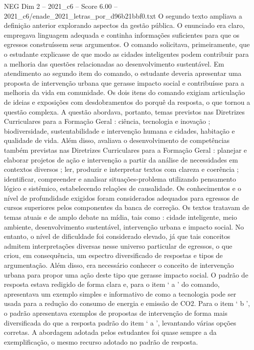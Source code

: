 \begin{textsample}{NEG Dim 2 – 2021\_c6 – Score 6.00 – 2021\_c6/enade\_2021\_letras\_por\_d96b21bbf0.txt}
O segundo texto ampliava a definição anterior explorando aspectos da gestão pública.
O enunciado era claro, empregava linguagem adequada e continha informações suficientes para que os egressos construíssem seus argumentos.
O comando solicitava, primeiramente, que o estudante explicasse de que modo as cidades inteligentes podem contribuir para a melhoria das questões relacionadas ao desenvolvimento sustentável.
Em atendimento ao segundo item do comando, o estudante deveria apresentar uma proposta de intervenção urbana que gerasse impacto social e contribuísse para a melhoria da vida em comunidade.
Os dois itens do comando exigiam articulação de ideias e exposições com desdobramentos do porquê da resposta, o que tornou a questão complexa.
A questão abordava, portanto, temas previstos nas Diretrizes Curriculares para a Formação Geral : ciência, tecnologia e inovação ; biodiversidade, sustentabilidade e intervenção humana e cidades, habitação e qualidade de vida.
Além disso, avaliava o desenvolvimento de competências também previstas nas Diretrizes Curriculares para a Formação Geral : planejar e elaborar projetos de ação e intervenção a partir da análise de necessidades em contextos diversos ; ler, produzir e interpretar textos com clareza e coerência ; identificar, compreender e analisar situações-problema utilizando pensamento lógico e sistêmico, estabelecendo relações de causalidade.
Os conhecimentos e o nível de profundidade exigidos foram considerados adequados para egressos de cursos superiores pelos componentes da banca de correção.
Os textos tratavam de temas atuais e de amplo debate na mídia, tais como : cidade inteligente, meio ambiente, desenvolvimento sustentável, intervenção urbana e impacto social.
No entanto, o nível de dificuldade foi considerado elevado, já que tais conceitos admitem interpretações diversas nesse universo particular de egressos, o que criou, em consequência, um espectro diversificado de respostas e tipos de argumentação.
Além disso, era necessário conhecer o conceito de intervenção urbana para propor uma ação deste tipo que gerasse impacto social.
O padrão de resposta estava redigido de forma clara e, para o item ‘ a ’ do comando, apresentava um exemplo simples e informativo de como a tecnologia pode ser usada para a redução do consumo de energia e emissão de CO2.
Para o item ‘ b ’, o padrão apresentava exemplos de propostas de intervenção de forma mais diversificada do que a resposta padrão do item ‘ a ’, levantando várias opções corretas.
A abordagem adotada pelos estudantes foi quase sempre a da exemplificação, o mesmo recurso adotado no padrão de resposta.

\end{textsample}
